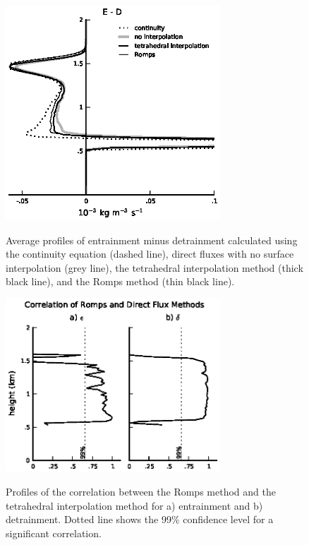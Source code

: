 \documentclass[12pt]{article}
\begin{document}
\begin{figure}[t]
  \noindent
  \includegraphics[width=19pc,angle=0]{./figures/E_minus_D}\\
  \caption{Average profiles of entrainment minus detrainment calculated using 
  the continuity equation (dashed line), direct fluxes with no surface 
  interpolation (grey line), the tetrahedral interpolation method
  (thick black line), and the Romps method (thin black line).
  }\label{fig:E_minus_D}
\end{figure}

\begin{figure}[t]
  \noindent
  \includegraphics[width=19pc,angle=0]{./figures/correlations}\\
  \caption{
  Profiles of the correlation between the Romps method and the
  tetrahedral interpolation method for a) entrainment and b) detrainment.  
  Dotted line shows the 99\% confidence level for a significant correlation.
  }
  \label{fig:correlations}
\end{figure}
\end{document}
